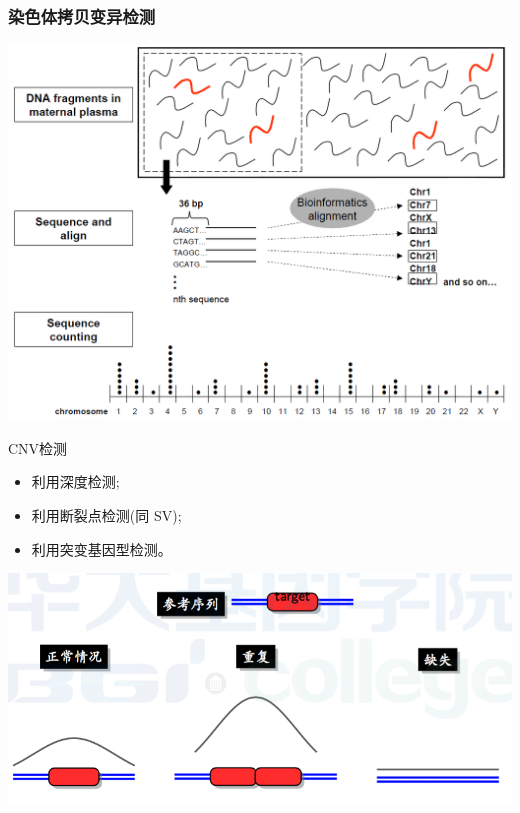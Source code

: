 \documentclass[12pt]{beamer}
\begin{document}
\begin{frame}\frametitle{染色体拷贝变异检测}
  \includegraphics[width=\textwidth]{figures/nift.png}  
\end{frame}


\begin{frame}{CNV检测}
  \begin{itemize}
  \item 利用深度检测;
  \item 利用断裂点检测(同 SV);
  \item 利用突变基因型检测。
  \end{itemize}
  \includegraphics[width=\textwidth]{figures/old_slides/cnv2.png}
\end{frame}
\end{document}
